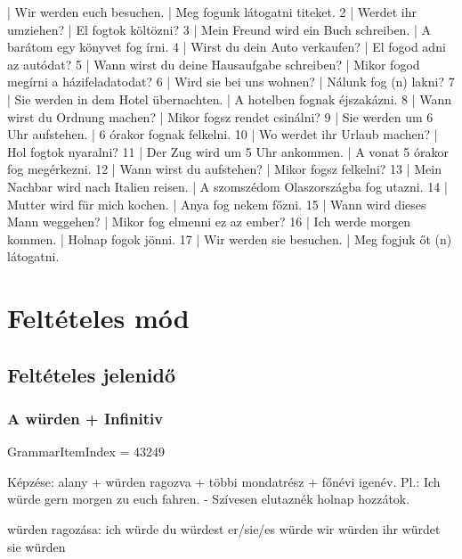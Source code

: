 \documentclass{article}
\newenvironment{desc}{\verbatim}{\endverbatim}
\newenvironment{exmp}{\verbatim}{\endverbatim}
\begin{document}
\begin{exmp}
1 | Wir werden euch besuchen. | Meg fogunk látogatni titeket.
2 | Werdet ihr umziehen? | El fogtok költözni?
3 | Mein Freund wird ein Buch schreiben. | A barátom egy könyvet fog írni.
4 | Wirst du dein Auto verkaufen? | El fogod adni az autódat?
5 | Wann wirst du deine Hausaufgabe schreiben? | Mikor fogod megírni a házifeladatodat?
6 | Wird sie bei uns wohnen? | Nálunk fog (n) lakni?
7 | Sie werden in dem Hotel übernachten. | A hotelben fognak éjszakázni.
8 | Wann wirst du Ordnung machen? | Mikor fogsz rendet csinálni?
9 | Sie werden um 6 Uhr aufstehen. | 6 órakor fognak felkelni.
10 | Wo werdet ihr Urlaub machen? | Hol fogtok nyaralni?
11 | Der Zug wird um 5 Uhr ankommen. | A vonat 5 órakor fog megérkezni.
12 | Wann wirst du aufstehen? | Mikor fogsz felkelni?
13 | Mein Nachbar wird nach Italien reisen. | A szomszédom Olaszországba fog utazni.
14 | Mutter wird für mich kochen. | Anya fog nekem főzni.
15 | Wann wird dieses Mann weggehen? | Mikor fog elmenni ez az ember?
16 | Ich werde morgen kommen. | Holnap fogok jönni.
17 | Wir werden sie besuchen. | Meg fogjuk őt (n) látogatni.
\end{exmp}

\section{Feltételes mód}

\subsection{Feltételes jelenidő}

\subsubsection{A würden + Infinitiv}

GrammarItemIndex = 43249

\begin{desc}
Képzése: alany + würden ragozva + többi mondatrész + főnévi igenév.
Pl.: Ich würde gern morgen zu euch fahren. - Szívesen elutaznék holnap hozzátok.

würden ragozása:
ich würde
du würdest
er/sie/es würde
wir würden
ihr würdet
sie würden
\end{desc}
\end{document}
